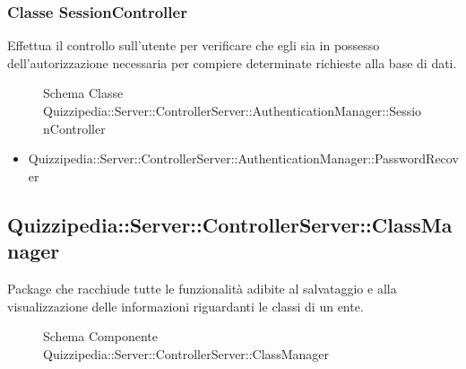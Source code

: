 \subsubsection{Classe SessionController}
Effettua il controllo sull'utente per verificare che egli sia in possesso dell'autorizzazione necessaria per compiere determinate richieste alla base di dati.
\begin{figure}[H]
\centering
\noindent{}
\caption[Schema Classe SessionController]{Schema Classe Quizzipedia::Server::ControllerServer::AuthenticationManager::SessionController}
\end{figure}
\begin{itemize}
\item Quizzipedia::Server::ControllerServer::AuthenticationManager::PasswordRecover
\end{itemize}
\subsection{Quizzipedia::Server::ControllerServer::ClassManager}
Package che racchiude tutte le funzionalità adibite al salvataggio e alla visualizzazione delle informazioni riguardanti le classi di un ente.
\begin{figure}[H]
\centering
\noindent{}
\caption[Schema Componente Quizzipedia::Server::ControllerServer::ClassManager]{Schema Componente Quizzipedia::Server::ControllerServer::ClassManager}
\end{figure}
